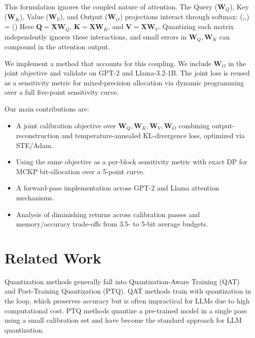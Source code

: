 \documentclass[10pt,twocolumn,letterpaper]{article}
\let\oldequation\equation
\let\oldendequation\endequation
\renewenvironment{equation}{\oldequation\small}{\oldendequation}
\begin{document}
This formulation ignores the coupled nature of attention. The Query ($\mathbf{W}_Q$), Key ($\mathbf{W}_K$), Value ($\mathbf{W}_V$), and Output ($\mathbf{W}_O$) projections interact through softmax:
\begin{equation}
(,,) = \left(\right)
\end{equation}
Here $\mathbf{Q} = \mathbf{X}\mathbf{W}_Q$, $\mathbf{K} = \mathbf{X}\mathbf{W}_K$, and $\mathbf{V} = \mathbf{X}\mathbf{W}_V$. Quantizing each matrix independently ignores these interactions, and small errors in $\mathbf{W}_Q,\mathbf{W}_K$ can compound in the attention output.

We implement a method that accounts for this coupling. We include $\mathbf{W}_O$ in the joint objective and validate on GPT-2 and Llama-3.2-1B. The joint loss is reused as a sensitivity metric for mixed-precision allocation via dynamic programming over a full five-point sensitivity curve.

Our main contributions are:
\begin{itemize}[leftmargin=*,itemsep=0pt,topsep=2pt]
    \item A joint calibration objective over $\mathbf{W}_Q,\mathbf{W}_K,\mathbf{W}_V,\mathbf{W}_O$ combining output-reconstruction and temperature-annealed KL-divergence loss, optimized via STE/Adam.
    \item Using the same objective as a per-block sensitivity metric with exact DP for MCKP bit-allocation over a 5-point curve.
    \item A forward-pass implementation across GPT-2 and Llama attention mechanisms.
    \item Analysis of diminishing returns across calibration passes and memory/accuracy trade-offs from 3.5- to 5-bit average budgets.
\end{itemize}

\section{Related Work}

Quantization methods generally fall into Quantization-Aware Training (QAT) and Post-Training Quantization (PTQ). QAT methods \cite{liu2023llmqat} train with quantization in the loop, which preserves accuracy but is often impractical for LLMs due to high computational cost. PTQ methods quantize a pre-trained model in a single pass using a small calibration set and have become the standard approach for LLM quantization.
\end{document}
